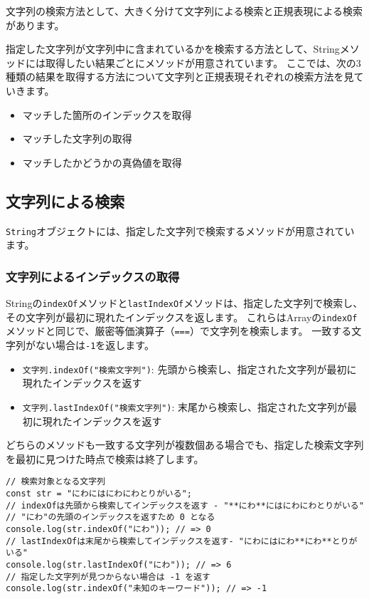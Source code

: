文字列の検索方法として、大きく分けて文字列による検索と正規表現による検索があります。

指定した文字列が文字列中に含まれているかを検索する方法として、Stringメソッドには取得したい結果ごとにメソッドが用意されています。
ここでは、次の3種類の結果を取得する方法について文字列と正規表現それぞれの検索方法を見ていきます。

\begin{itemize}
\item
  マッチした箇所のインデックスを取得
\item
  マッチした文字列の取得
\item
  マッチしたかどうかの真偽値を取得
\end{itemize}

\hypertarget{search-by-string}{%
\subsection{文字列による検索}\label{search-by-string}}

\texttt{String}オブジェクトには、指定した文字列で検索するメソッドが用意されています。

\hypertarget{search-index-by-string}{%
\subsubsection{文字列によるインデックスの取得}\label{search-index-by-string}}

Stringの\texttt{indexOf}メソッドと\texttt{lastIndexOf}メソッドは、指定した文字列で検索し、その文字列が最初に現れたインデックスを返します。
これらはArrayの\texttt{indexOf}メソッドと同じで、厳密等価演算子（\texttt{===}）で文字列を検索します。
一致する文字列がない場合は\texttt{-1}を返します。

\begin{itemize}
\item
  \texttt{文字列.indexOf("検索文字列")}:
  先頭から検索し、指定された文字列が最初に現れたインデックスを返す
\item
  \texttt{文字列.lastIndexOf("検索文字列")}:
  末尾から検索し、指定された文字列が最初に現れたインデックスを返す
\end{itemize}

どちらのメソッドも一致する文字列が複数個ある場合でも、指定した検索文字列を最初に見つけた時点で検索は終了します。

\begin{lstlisting}
// 検索対象となる文字列
const str = "にわにはにわにわとりがいる";
// indexOfは先頭から検索してインデックスを返す - "**にわ**にはにわにわとりがいる"
// "にわ"の先頭のインデックスを返すため 0 となる
console.log(str.indexOf("にわ")); // => 0
// lastIndexOfは末尾から検索してインデックスを返す- "にわにはにわ**にわ**とりがいる"
console.log(str.lastIndexOf("にわ")); // => 6
// 指定した文字列が見つからない場合は -1 を返す
console.log(str.indexOf("未知のキーワード")); // => -1
\end{lstlisting}

